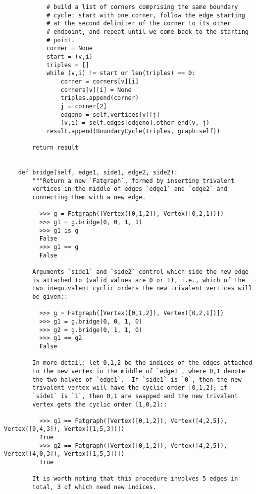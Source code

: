 \begin{lstlisting}
            # build a list of corners comprising the same boundary
            # cycle: start with one corner, follow the edge starting
            # at the second delimiter of the corner to its other
            # endpoint, and repeat until we come back to the starting
            # point.  
            corner = None
            start = (v,i)
            triples = []
            while (v,i) != start or len(triples) == 0:
                corner = corners[v][i]
                corners[v][i] = None
                triples.append(corner)
                j = corner[2]
                edgeno = self.vertices[v][j]
                (v,i) = self.edges[edgeno].other_end(v, j)
            result.append(BoundaryCycle(triples, graph=self))

        return result
        

    def bridge(self, edge1, side1, edge2, side2):
        """Return a new `Fatgraph`, formed by inserting trivalent
        vertices in the middle of edges `edge1` and `edge2` and
        connecting them with a new edge.

          >>> g = Fatgraph([Vertex([0,1,2]), Vertex([0,2,1])])
          >>> g1 = g.bridge(0, 0, 1, 1)
          >>> g1 is g
          False
          >>> g1 == g
          False
          
        Arguments `side1` and `side2` control which side the new edge
        is attached to (valid values are 0 or 1), i.e., which of the
        two inequivalent cyclic orders the new trivalent vertices will
        be given::
        
          >>> g = Fatgraph([Vertex([0,1,2]), Vertex([0,2,1])])
          >>> g1 = g.bridge(0, 0, 1, 0)
          >>> g2 = g.bridge(0, 1, 1, 0)
          >>> g1 == g2
          False

        In more detail: let 0,1,2 be the indices of the edges attached
        to the new vertex in the middle of `edge1`, where 0,1 denote
        the two halves of `edge1`.  If `side1` is `0`, then the new
        trivalent vertex will have the cyclic order [0,1,2]; if
        `side1` is `1`, then 0,1 are swapped and the new trivalent
        vertex gets the cyclic order [1,0,2]::

          >>> g1 == Fatgraph([Vertex([0,1,2]), Vertex([4,2,5]), Vertex([0,4,3]), Vertex([1,5,3])])
          True
          >>> g2 == Fatgraph([Vertex([0,1,2]), Vertex([4,2,5]), Vertex([4,0,3]), Vertex([1,5,3])])
          True

        It is worth noting that this procedure involves 5 edges in
        total, 3 of which need new indices.


\end{lstlisting}

